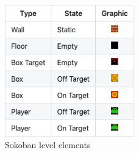 \begin{figure}[H]
\includegraphics[width=0.5\textwidth,keepaspectratio]{figures/Sokoban_elements.png}
\caption[]{Sokoban level elements}
\label{Fig.Sokoban_elements}
\end{figure}
